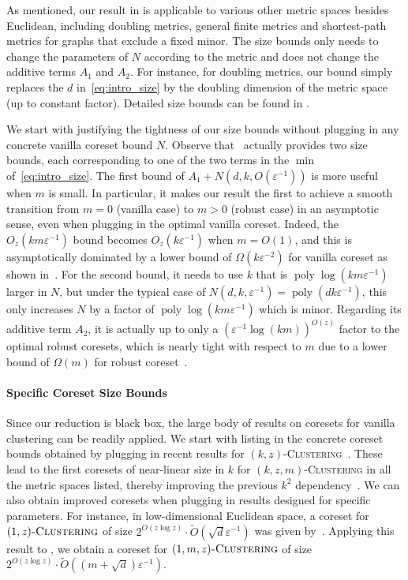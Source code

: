 \documentclass[letterpaper,11pt]{article}
\theoremstyle{plain}
\theoremstyle{definition}
\theoremstyle{remark}
\DeclareMathOperator{\poly}{poly}
\newcommand{\eps}{\varepsilon}
\renewcommand{\epsilon}{\varepsilon}
\newcommand{\ProblemName}[1]{\textsc{#1}}
\newcommand{\kzC}{\ProblemName{$(k,z)$-Clustering}\xspace}
\newcommand{\tzC}[1]{\ProblemName{$(#1,z)$-Clustering}\xspace}
\newcommand{\tzmC}[1]{\ProblemName{$(#1,m,z)$-Clustering}\xspace}
\newcommand{\kzmC}{\ProblemName{$(k,z,m)$-Clustering}\xspace}
\begin{document}
As mentioned, our result in  is applicable to various other metric spaces besides Euclidean,
including doubling metrics, general finite metrics and shortest-path metrics for graphs that exclude a fixed minor.
The size bounds only needs to change the parameters of $N$ according to the metric and does not change the additive terms $A_1$ and $A_2$.
For instance, for doubling metrics, our bound simply replaces the $d$ in~\eqref{eq:intro_size} by the doubling dimension of the metric space (up to constant factor).
Detailed size bounds can be found in .



We start with justifying the tightness of our size bounds without plugging in any concrete vanilla coreset bound $N$. Observe that~ actually provides two size bounds, each corresponding to one of the two terms in the $\min$ of~\eqref{eq:intro_size}.
The first bound of $A_1 + N(d,k,O(\eps^{-1}))$ is more useful when $m$ is small.
In particular, it makes our result the first to achieve a smooth transition from $m = 0$ (vanilla case) to $m > 0$ (robust case) in an asymptotic sense, even when plugging in the optimal vanilla coreset.
Indeed, the $O_z(km \epsilon^{-1})$ bound becomes $O_z(k \epsilon^{-1})$ when $m = O(1)$,
and this is asymptotically dominated by a lower bound of $\Omega(k \epsilon^{-2})$ for vanilla coreset as shown in~\cite{Cohen-Addad22Towards}.
For the second bound, it needs to use $k$ that is $\poly\log(km\epsilon^{-1})$ larger in $N$, but under the typical case of $N(d,k,\eps^{-1}) = \poly(dk\eps^{-1})$, this only increases $N$ by a factor of $\poly\log(km\eps^{-1})$ which is minor.
Regarding its additive term $A_2$, it is actually up to only a $(\epsilon^{-1}\log (km))^{O(z)}$ factor to the optimal robust coresets,
which is nearly tight with respect to $m$
due to a lower bound of $\Omega(m)$ for robust coreset~\cite{Huang2022Near-optimal}.


\paragraph{Specific Coreset Size Bounds} 
Since our reduction is black box, the large body of results on coresets for vanilla clustering can be readily applied.
We start with listing in  the concrete coreset bounds
obtained by plugging in recent results for \kzC~\cite{Cohen-Addad22Towards,DBLP:conf/nips/Cohen-AddadLSSS22,Huang22OnOptimal,Cohen-AddadD0SS25}.
These lead to the first coresets of near-linear size in $k$ for \kzmC in all the metric spaces listed,
thereby improving the previous $k^2$ dependency~\cite{feldman2012data,Huang2022Near-optimal,Huang2023General}.
We can also obtain improved coresets when plugging in results designed for specific parameters.
For instance, in low-dimensional Euclidean space, a coreset for $\tzC{1}$ of size $2^{O(z \log z)} \cdot \tilde{O}(\sqrt{d}\eps^{-1})$ was given by~\cite{DBLP:conf/icml/HuangHH023}.
Applying this result to , we obtain a coreset for $\tzmC{1}$ of size $2^{O(z \log z)} \cdot \tilde{O}((m + \sqrt{d})\eps^{-1})$.
\end{document}
